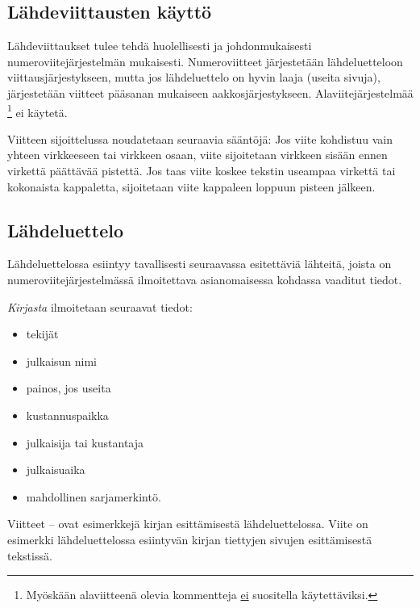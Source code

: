 \documentclass[english,12pt,a4paper,pdftex,elec,utf8]{aaltothesis}
\begin{document}
\subsection*{L\"ahdeviittausten k\"aytt\"o} 

L\"ahdeviittaukset tulee tehd\"a huolellisesti ja johdonmukaisesti
numeroviitej\"arjestelm\"an mukaisesti. Numeroviitteet j\"arjestet\"a\"an
l\"ahdeluetteloon viittausj\"arjestykseen, mutta jos l\"ahdeluettelo
on hyvin laaja (useita sivuja), j\"arjestet\"a\"an viitteet p\"a\"asanan 
mukaiseen aakkosj\"arjestykseen. Alaviitej\"arjestelm\"a\"a
\footnote{My\"osk\"a\"an alaviitteen\"a olevia kommentteja \underline{ei} suositella
k\"aytett\"aviksi.} ei k\"aytet\"a. 

Viitteen sijoittelussa noudatetaan seuraavia s\"a\"ant\"oj\"a:
Jos viite kohdistuu vain yhteen virkkeeseen tai virkkeen 
osaan, viite \cite{Kauranen} sijoitetaan virkkeen sis\"a\"an ennen virkett\"a
p\"a\"att\"av\"a\"a pistett\"a. Jos taas viite koskee tekstin useampaa
virkett\"a tai kokonaista kappaletta, sijoitetaan viite kappaleen loppuun 
pisteen j\"alkeen. \cite{Kauranen} 

\subsection*{L\"ahdeluettelo} 

L\"ahdeluettelossa esiintyy tavallisesti seuraavassa esitett\"avi\"a
l\"ahteit\"a, joista on numeroviitej\"arjestelm\"ass\"a ilmoitettava
asianomaisessa kohdassa vaaditut tiedot.

\textit{Kirjasta} ilmoitetaan seuraavat tiedot:

\begin{itemize}
\item[--]tekij\"at 
\item[--]julkaisun nimi
\item[--]painos, jos useita
\item[--]kustannuspaikka
\item[--]julkaisija tai kustantaja
\item[--]julkaisuaika
\item[--]mahdollinen sarjamerkint\"o. 
\end{itemize}

Viitteet \cite{Kauranen}--\cite{Koblitz} ovat esimerkkej\"a kirjan
esitt\"amisest\"a l\"ahdeluettelossa. Viite \cite[s.\ 83--124]{Koblitz} on
esimerkki l\"ahdeluettelossa esiintyv\"an kirjan tiettyjen sivujen
esitt\"amisest\"a tekstiss\"a.
\end{document}
